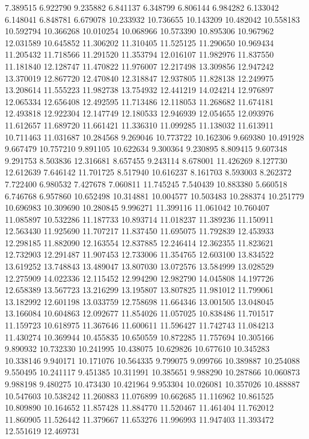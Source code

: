 7.389515
6.922790
9.235882
6.841137
6.348799
6.806144
6.984282
6.133042
6.148041
6.848781
6.679078
10.233932
10.736655
10.143209
10.482042
10.558183
10.592794
10.366268
10.010254
10.068966
10.573390
10.895306
10.967962
12.031589
10.645852
11.306202
11.310405
11.525125
11.290650
10.969434
11.205432
11.718566
11.291520
11.353794
12.016107
11.982976
11.837550
11.181840
12.128747
11.470822
11.976007
12.217498
13.309856
12.947242
13.370019
12.867720
12.470840
12.318847
12.937805
11.828138
12.249975
13.208614
11.555223
11.982738
13.754932
12.441219
14.024214
12.976897
12.065334
12.656408
12.492595
11.713486
12.118053
11.268682
11.674181
12.493818
12.922304
12.147749
12.180533
12.946939
12.054655
12.093976
11.612657
11.689720
11.661421
11.336310
11.099285
11.138032
11.613911
10.711463
11.031687
10.284568
9.269046
10.773722
10.162306
9.669380
10.491928
9.667479
10.757210
9.891105
10.622634
9.300364
9.230895
8.809415
9.607348
9.291753
8.503836
12.316681
8.657455
9.243114
8.678001
11.426269
8.127730
12.612639
7.646142
11.701725
8.517940
10.616237
8.161703
8.593003
8.262372
7.722400
6.980532
7.427678
7.060811
11.745245
7.540439
10.883380
5.660518
6.746768
6.957860
10.652498
10.314881
10.004577
10.503483
10.288374
10.251779
10.696983
10.309690
10.280845
9.996271
11.399116
11.061042
10.760407
11.085897
10.532286
11.187733
10.893714
11.018237
11.389236
11.150911
12.563430
11.925690
11.707217
11.837450
11.695075
11.792839
12.453933
12.298185
11.882090
12.163554
12.837885
12.246414
12.362355
11.823621
12.732903
12.291487
11.907453
12.733006
11.354765
12.603100
13.834522
13.619252
13.748843
13.489047
13.807030
13.072576
13.584999
13.028529
12.275909
14.022336
12.115452
12.994290
12.982790
14.045808
14.197726
12.658389
13.567723
13.216299
13.195807
13.807825
11.981012
11.799061
13.182992
12.601198
13.033759
12.758698
11.664346
13.001505
13.048045
13.166084
10.604863
12.092677
11.854026
11.057025
10.838486
11.701517
11.159723
10.618975
11.367646
11.600611
11.596427
11.742743
11.084213
11.430274
10.369944
10.455835
10.650559
10.872285
11.757694
10.305166
9.890932
10.732330
10.241995
10.438075
10.629826
10.677610
10.345283
10.338146
9.940171
10.171076
10.564335
9.799075
9.099766
10.389887
10.254088
9.550495
10.241117
9.451385
10.311991
10.385651
9.988290
10.287866
10.060873
9.988198
9.480275
10.473430
10.421964
9.953304
10.026081
10.357026
10.488887
10.547603
10.538242
11.260883
11.076899
10.662685
11.116962
10.861525
10.809890
10.164652
11.857428
11.884770
11.520467
11.461404
11.762012
11.860905
11.526442
11.379667
11.653276
11.996993
11.947403
11.393472
12.551619
12.469731
